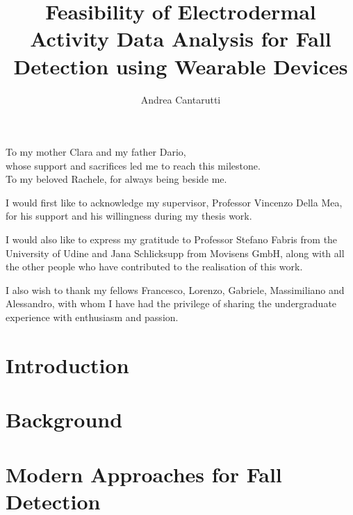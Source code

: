 \documentclass[target=bach, hidelinks]{thud}
\title{Feasibility of Electrodermal Activity Data Analysis for Fall Detection using Wearable Devices}
\author{Andrea Cantarutti}
\begin{document}
\maketitle

\pagestyle{big}

\begin{dedication}

To my mother Clara and my father Dario, \\ whose support and sacrifices led me to reach this milestone. \\
To my beloved Rachele, for always being beside me.
\end{dedication}

\acknowledgements

I would first like to acknowledge my supervisor, Professor Vincenzo Della Mea, for his support and his willingness during my thesis work.

I would also like to express my gratitude to Professor Stefano Fabris from the University of Udine and Jana Schlicksupp from Movisens GmbH, along with all the other people who have contributed to the realisation of this work.

I also wish to thank my fellows Francesco, Lorenzo, Gabriele, Massimiliano and Alessandro, with whom I have had the privilege of sharing the undergraduate experience with enthusiasm and passion.


\tableofcontents

\listoftables

\listoffigures


\mainmatter

\chapter{Introduction}


\chapter{Background}


\chapter{Modern Approaches for Fall Detection}

\end{document}
